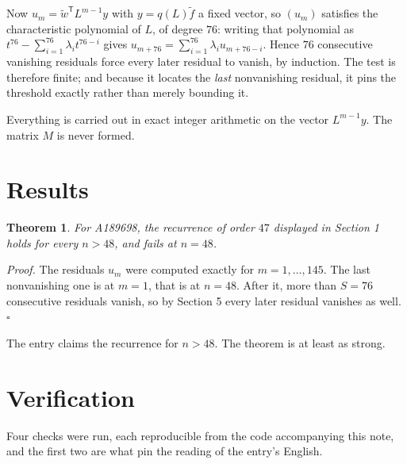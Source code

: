 \documentclass[11pt]{article}
\newtheorem{theorem}{Theorem}
\theoremstyle{definition}
\begin{document}
Now $u_m = \tilde w^{\mathsf T} L^{m-1} y$ with $y = q(L)\tilde f$ a fixed vector, so $(u_m)$ satisfies the characteristic polynomial of $L$, of degree $76$: writing that polynomial as $t^{76} - \sum_{i=1}^{76} \lambda_i t^{76-i}$ gives $u_{m+76} = \sum_{i=1}^{76} \lambda_i u_{m+76-i}$. Hence $76$ consecutive vanishing residuals force every later residual to vanish, by induction. The test is therefore finite; and because it locates the {\itshape last} nonvanishing residual, it pins the threshold exactly rather than merely bounding it.

Everything is carried out in exact integer arithmetic on the vector $L^{m-1}y$. The matrix $M$ is never formed.

\section{Results}

\begin{theorem} For A189698, the recurrence of order $47$ displayed in Section 1 holds for every $n > 48$, and fails at $n = 48$.\end{theorem}

{\itshape Proof.} The residuals $u_m$ were computed exactly for $m = 1,\dots,145$. The last nonvanishing one is at $m = 1$, that is at $n = 48$. After it, more than $S = 76$ consecutive residuals vanish, so by Section 5 every later residual vanishes as well. $\square$

The entry claims the recurrence for $n > 48$. The theorem is at least as strong.

\section{Verification}

Four checks were run, each reproducible from the code accompanying this note, and the first two are what pin the reading of the entry's English.
\end{document}
